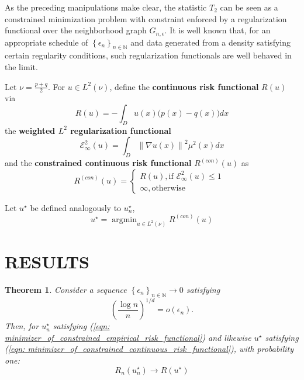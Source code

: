 \documentclass{article}
\newcommand{\norm}[1]{\left\lVert#1\right\rVert}
\newcommand{\set}[1]{\left\{#1\right\}}
\newcommand{\seq}[1]{\set{#1}_{n \in \N}}
\DeclareMathOperator*{\argmin}{argmin}
\newcommand{\N}{\mathbb{N}}
\theoremstyle{alden}
\theoremstyle{aldenthm}
\newtheorem{theorem}{Theorem}
\theoremstyle{remark}
\begin{document}
As the preceding manipulations make clear, the statistic $T_2$ can be seen as a constrained minimization problem with constraint enforced by a regularization functional over the neighborhood graph $G_{n,\epsilon}$. It is well known that, for an appropriate schedule of $\seq{\epsilon_n}$ and data generated from a density satisfying certain regularity conditions, such regularization functionals are well behaved in the limit. 

Let $\nu = \frac{p + q}{2}$. For $u \in L^2(\nu)$, define the \textbf{continuous risk functional} $R(u)$ via
\begin{equation*}
R(u) = -\int_{D} u(x) \bigl(p(x) - q(x) \bigr) dx
\end{equation*}
the \textbf{weighted $L^2$ regularization functional}
\begin{equation*}
\mathcal{E}_{\infty}^2(u) = \int_D \norm{\nabla u(x)}^2 \mu^2(x) dx
\end{equation*}
and the \textbf{constrained continuous risk functional} $R^{(con)}(u)$ as
\begin{equation*}
R^{(con)}(u) =
\begin{cases}
R(u), \text{if $\mathcal{E}_{\infty}^2(u) \leq 1$ } \\
\infty, \text{otherwise}
\end{cases}
\end{equation*}

Let $u^{\star}$ be defined analogously to $u_n^{\star}$,
\begin{equation}
\label{eqn: minimizer_of_constrained_continuous_risk_functional}
u^{\star} = \argmin_{u \in L^2(\nu)} R^{(con)}(u)
\end{equation}

\section{RESULTS}
\begin{theorem}
	\label{thm: consistency_of_empirical_risk_minimizer}
	Consider a sequence $\seq{\epsilon_n} \to 0$ satisfying
	\begin{equation*}
	\left(\frac{\log n}{n}\right)^{1/d} = o(\epsilon_n).
	\end{equation*}
	Then, for $u_n^{\star}$ satisfying (\ref{eqn: minimizer_of_constrained_empirical_risk_functional}) and likewise $u^{\star}$ satisfying (\ref{eqn: minimizer_of_constrained_continuous_risk_functional}), with probability one:
	\begin{equation}
	R_n(u_n^{\star}) \to R(u^{\star})
	\end{equation}
\end{theorem}
\end{document}
